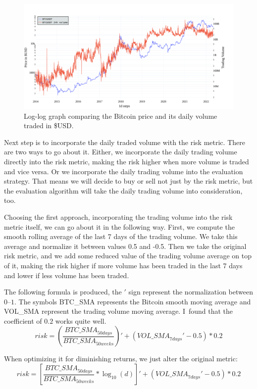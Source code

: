 \begin{figure}[!t]
    \centering
    \includegraphics[width=\columnwidth]{figures/24volume-log.pdf}
    \caption{Log-log graph comparing the Bitcoin price and its daily volume traded in \$USD.}
    \label{figure-24volume-log}
\end{figure}

Next step is to incorporate the daily traded volume with the risk metric. There are two ways to go about it. Either, we incorporate the daily trading volume directly into the risk metric, making the risk higher when more volume is traded and vice versa. Or we incorporate the daily trading volume into the evaluation strategy. That means we will decide to buy or sell not just by the risk metric, but the evaluation algorithm will take the daily trading volume into consideration, too.

Choosing the first approach, incorporating the trading volume into the risk metric itself, we can go about it in the following way. First, we compute the smooth rolling average of the last 7 days of the trading volume. We take this average and normalize it between values 0.5 and -0.5. Then we take the original risk metric, and we add some reduced value of the trading volume average on top of it, making the risk higher if more volume has been traded in the last 7 days and lower if less volume has been traded.

The following formula is produced, the $'$ sign represent the normalization between $0$--$1$. The symbols BTC\_SMA represents the Bitcoin smooth moving average and VOL\_SMA represent the trading volume moving average. I~found that the coefficient of $0.2$ works quite well.
$$risk = \left(\frac{\mathit{BTC\_SMA}_{50 days}}{\mathit{BTC\_SMA}_{50 weeks}}\right)' + \left(\mathit{VOL\_SMA}_{7 days}' - 0.5\right) * 0.2$$

When optimizing it for diminishing returns, we just alter the original metric:
$$risk = \left[\frac{\mathit{BTC\_SMA}_{50 days}}{\mathit{BTC\_SMA}_{50 weeks}} * \log_{10}(d)\right]' + \left(\mathit{VOL\_SMA}_{7 days}' - 0.5\right) * 0.2$$

